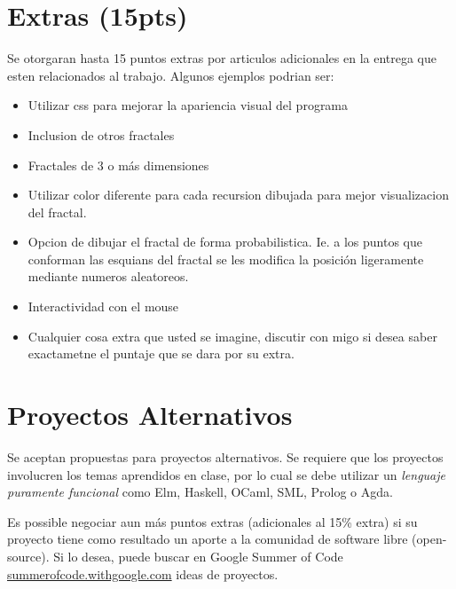 \documentclass{article}
\begin{document}
\section*{Extras (15pts)}
Se otorgaran hasta 15 puntos extras por articulos adicionales en la entrega que esten relacionados
al trabajo. Algunos ejemplos podrian ser:
\begin{itemize}
        \item{Utilizar css para mejorar la apariencia visual del programa}
        \item{Inclusion de otros fractales}
        \item{Fractales de 3 o m\'as dimensiones}
        \item{Utilizar color diferente para cada recursion dibujada para mejor
        visualizacion del fractal.}
        \item{Opcion de dibujar el fractal de forma probabilistica. Ie. a los
        puntos que conforman las esquians del fractal se les modifica la posici\'on
        ligeramente mediante numeros aleatoreos.}
        \item{Interactividad con el mouse}
        \item{Cualquier cosa extra que usted se imagine, discutir con migo
        si desea saber exactametne el puntaje que se dara por su extra.}
\end{itemize}

\section*{Proyectos Alternativos}

Se aceptan propuestas para proyectos alternativos. Se requiere que los proyectos
involucren los temas aprendidos en clase, por lo cual se debe utilizar un
\emph{lenguaje puramente funcional} como Elm, Haskell, OCaml, SML, Prolog o Agda.

Es possible negociar aun m\'as puntos extras (adicionales al 15\% extra) si su proyecto
tiene como resultado un aporte a la comunidad de software libre (open-source). Si
lo desea, puede buscar en Google Summer of Code \url{summerofcode.withgoogle.com}
ideas de proyectos.
\end{document}
